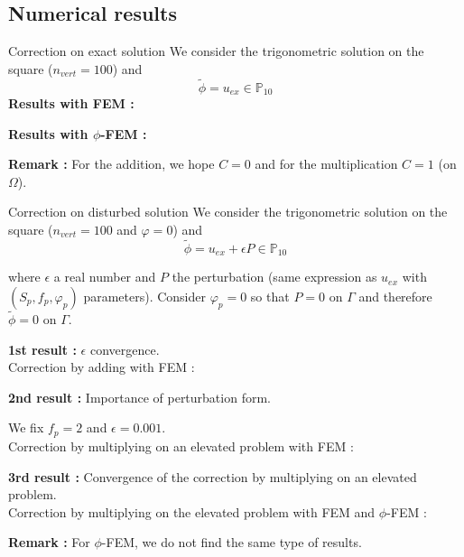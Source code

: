 \documentclass[compress,10pt,xcolor={table,dvipsnames},t]{beamer}
\begin{document}
	\subsection{Numerical results}
	
	\begin{frame}{Correction on exact solution}
		We consider the trigonometric solution on the square ($n_{vert}=100$) and
		$$\tilde{\phi}=u_{ex}\in\mathbb{P}_{10}$$
		\textbf{Results with FEM :}
		\begin{center}
		\end{center}
		\textbf{Results with $\phi$-FEM :}
		\begin{center}
		\end{center}
		\textbf{Remark :} For the addition, we hope $C=0$ and for the multiplication $C=1$ (on $\Omega$).
	\end{frame}

	\begin{frame}[allowframebreaks]{Correction on disturbed solution}
		We consider the trigonometric solution on the square ($n_{vert}=100$ and $\varphi=0$) and
		$$\tilde{\phi}=u_{ex}+\epsilon P\in\mathbb{P}_{10}$$
		
		where $\epsilon$ a real number and $P$ the perturbation (same expression as $u_{ex}$ with $(S_p,f_p,\varphi_p)$ parameters). Consider $\varphi_p=0$ so that $P=0$ on $\Gamma$ and therefore $\tilde{\phi}=0$ on $\Gamma$.
		
		\textbf{1st result :} $\epsilon$ convergence. \\
		Correction by adding with FEM :
		\begin{center}
		\end{center}
	
		\textbf{2nd result :} Importance of perturbation form.
		
		We fix $f_p=2$ and $\epsilon=0.001$. \\
		Correction by multiplying on an elevated problem with FEM :
		\begin{minipage}{0.58\linewidth}
			\centering
		\end{minipage} \;
		\begin{minipage}{0.38\linewidth}
			\centering
		\end{minipage}
	
		\newpage
	
		\textbf{3rd result :} Convergence of the correction by multiplying on an elevated problem. \\
		Correction by multiplying on the elevated problem with FEM and $\phi$-FEM :
		\begin{center}
		\end{center}
	
		\textbf{Remark :} For $\phi$-FEM, we do not find the same type of results.
	\end{frame}
\end{document}
